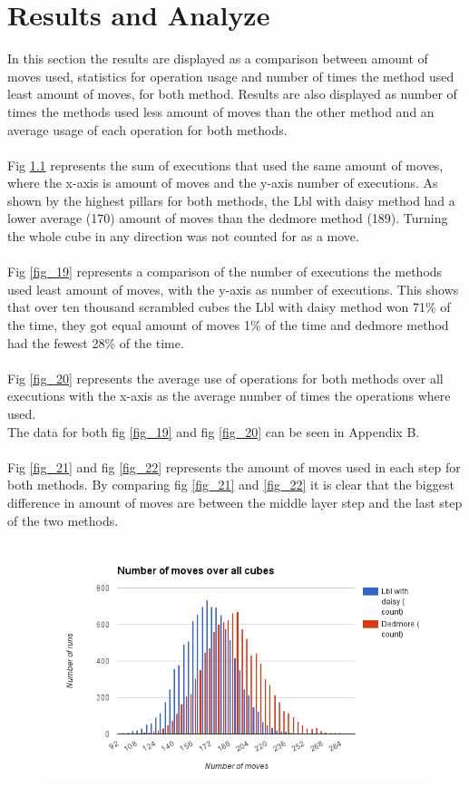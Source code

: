 \documentclass[a4paper,11pt]{kth-mag}
\begin{document}
\chapter{Results and Analyze}
In this section the results are displayed as a comparison between amount of moves used, statistics for operation usage and number of times the method used least amount of moves, for both method. Results are also displayed as number of times the methods used less amount of moves than the other method and an average usage of each operation for both methods.\\\\ 
Fig \ref{fig_18} represents the sum of executions that used the same amount of moves, where the x-axis is amount of moves and the y-axis number of executions. 
As shown by the highest pillars for both methods, the Lbl with daisy method had a lower average (170) amount of moves than the dedmore method (189). Turning the whole cube in any direction was not counted for as a move.\\\\
Fig \ref{fig_19} represents a comparison of the number of executions the methods used least amount of moves, with the y-axis as number of executions. 
This shows that over ten thousand scrambled cubes the Lbl with daisy method won 71\% of the time, they got equal amount of moves 1\% of the time and dedmore method had the fewest 28\% of the time.\\\\
Fig \ref{fig_20} represents the average use of operations for both methods over all executions with the x-axis as the average number of times the operations where used. \\The data for both fig \ref{fig_19} and fig \ref{fig_20} can be seen in Appendix B.\\\\ 
Fig \ref{fig_21} and fig \ref{fig_22} represents the amount of moves used in each step for both methods. By comparing fig \ref{fig_21} and \ref{fig_22} it is clear that the biggest difference in amount of moves are between the middle layer step and the last step of the two methods.
\begin{figure}[h!]
	\centering
	\includegraphics[width= 1.1\textwidth]{figs/graphone.png}
	\caption{}
	\label{fig_18}
\end{figure}
\end{document}

